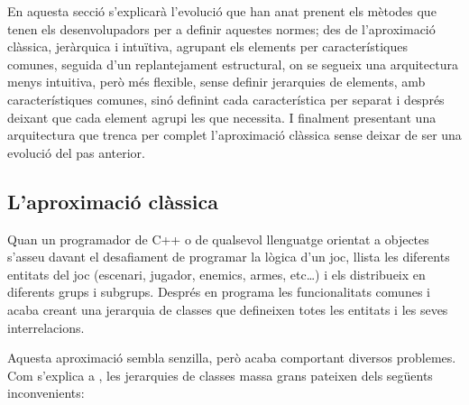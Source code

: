  En aquesta secció s'explicarà l'evolució que han anat prenent els mètodes que tenen els desenvolupadors per a definir aquestes normes; des de l'aproximació clàssica, jeràrquica i intuïtiva, agrupant els elements per característiques comunes, seguida d'un replantejament estructural, on se segueix una arquitectura menys intuitiva, però més flexible, sense definir jerarquies de elements, amb característiques comunes, sinó definint cada característica per separat i després deixant que cada element agrupi les que necessita. I finalment presentant una arquitectura que trenca per complet l'aproximació clàssica sense deixar de ser una evolució del pas anterior.

\subsection{L'aproximació clàssica}

Quan un programador de {C++} o de qualsevol llenguatge orientat a objectes s'asseu davant el desafiament de programar la lògica d'un joc, llista les diferents entitats del joc (escenari, jugador, enemics, armes, etc\ldots) i els distribueix en diferents grups i subgrups. Després en programa les funcionalitats comunes i acaba creant una jerarquia de classes que defineixen totes les entitats i les seves interrelacions. 

Aquesta aproximació sembla senzilla, però acaba comportant diversos problemes. Com s'explica a \citep[p.~719]{Gregory09}, les jerarquies de classes massa grans pateixen dels següents inconvenients:




